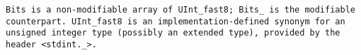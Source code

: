 \tt{Bits} is a non-modifiable array of \tt{UInt_fast8};
\tt{Bits_} is the modifiable counterpart.
\tt{UInt_fast8} is an implementation-defined synonym for an unsigned integer
type (possibly an extended type), provided by the header \tt{<stdint._>}.
